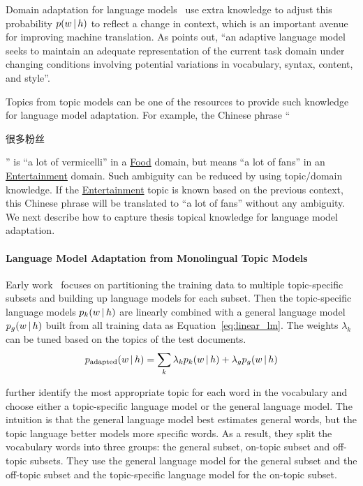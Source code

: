 Domain adaptation for language models~\citep{Bellegarda-04,wood-09}
use extra knowledge to adjust this probability $p(w \, | \, h)$ to reflect
a change in context, which is an important avenue for improving machine
translation. As \citet{Bellegarda-04} points out, ``an adaptive
language model seeks to maintain an adequate representation of the
current task domain under changing conditions involving potential
variations in vocabulary, syntax, content, and style''.

Topics from topic models can be one of the resources to provide such
knowledge for language model adaptation. For example, the Chinese
phrase ``\begin{CJK*}{UTF8}{gbsn}很多粉丝\end{CJK*}'' is 
  ``a lot of vermicelli'' in a \underline{Food} domain, but means ``a
  lot of fans'' in an \underline{Entertainment} domain. Such ambiguity
  can be reduced by using topic/domain knowledge. If the
  \underline{Entertainment} topic is known based on
  the previous context, this Chinese phrase will be translated to ``a
  lot of fans'' without any ambiguity. We next describe how to capture
  thesis topical knowledge for language model adaptation.

\paragraph{Language Model Adaptation from Monolingual Topic Models}

Early work~\citep{Clarkson-1997,Seymore-1997,Kneser-1997,Iyer-1999} focuses on
partitioning the training data to multiple topic-specific subsets and
building up language models for each subset. Then the topic-specific
language models $p_k(w \, | \, h)$ are linearly combined with a general
language model $p_g(w \, | \, h)$ built from all training data as
Equation~\ref{eq:linear_lm}. The weights $\lambda_k$ can be tuned
based on the topics of the test documents.
\begin{align}
\label{eq:linear_lm}
p_\textrm{adapted}(w \, | \, h) = \sum_k \lambda_k p_k(w \, | \, h) + \lambda_g
  p_g(w \, | \, h)
\end{align}

\citet{Seymore-1998} further identify the most appropriate topic for
each word in the vocabulary and choose either a topic-specific language model
or the general language model. The intuition is that the general
language model best estimates general
words, but the topic language better models more specific words. As a result, they split the vocabulary
words into three groups: the general subset, on-topic subset and
off-topic subsets. They use the general language model for the general subset and the off-topic subset and the topic-specific language model for  the
on-topic subset.

